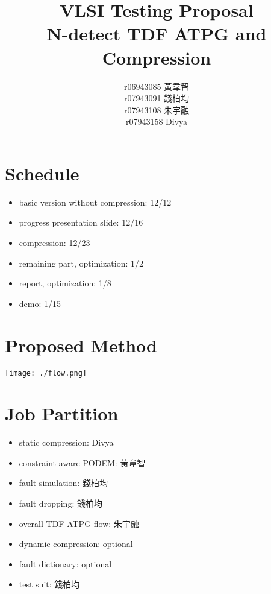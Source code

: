 \documentclass{report}
\title{
  VLSI Testing Proposal \\
  \large N-detect TDF ATPG and Compression
}
\author{
  r06943085 黃韋智 \\
  r07943091 錢柏均 \\
  r07943108 朱宇融 \\
  r07943158 Divya
}
\begin{document}
\begin{CJK}{UTF8}{bkai}

\maketitle

\section{Schedule}

  \begin{itemize}

    \item basic version without compression: 12/12
    \item progress presentation slide: 12/16
    \item compression: 12/23
    \item remaining part, optimization: 1/2
    \item report, optimization: 1/8
    \item demo: 1/15

  \end{itemize}

\section{Proposed Method}

  \texttt{[image: ./flow.png]}

\section{Job Partition}

  \begin{itemize}

    \item static compression: Divya
    \item constraint aware PODEM: 黃韋智
    \item fault simulation: 錢柏均
    \item fault dropping: 錢柏均
    \item overall TDF ATPG flow: 朱宇融
    \item dynamic compression: optional
    \item fault dictionary: optional
    \item test suit: 錢柏均

  \end{itemize}


\end{CJK}
\end{document}
